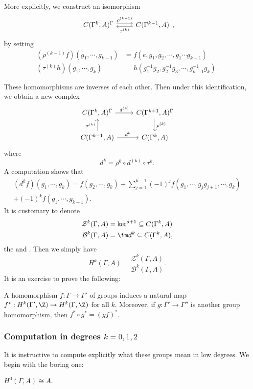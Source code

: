\documentclass[a4paper]{article}
\begin{document}
More explicitly, we construct an isomorphism
\[
  \begin{tikzcd}
    C(\Gamma^k, A)^\Gamma \ar[r, yshift=2, "\rho^{(k - 1)}"] & C(\Gamma^{k - 1}, A)\ar[l, yshift=-2, "\tau^{(k)}"]
  \end{tikzcd},
\]
by setting
\begin{align*}
  (\rho^{(k - 1)} f)(g_1, \cdots, g_{k - 1}) &= f(e, g_1, g_2, \cdots, g_1 \cdots g_{k - 1})\\
  (\tau^{(k)} h)(g_1, \cdots, g_k) &= h (g_1^{-1} g_2, g_2^{-1} g_3, \cdots, g_{k - 1}^{-1} g_k).
\end{align*}

These homomorphisms are inverses of each other. Then under this identification, we obtain a new complex
\[
  \begin{tikzcd}
    C(\Gamma^k, A)^\Gamma \ar[r, "d^{(k)}"] & C(\Gamma^{k + 1}, A)^\Gamma \ar[d,"\rho^{(k)}"] \\
    C(\Gamma^{k - 1}, A) \ar[u, "\tau^{(k)}"] \ar[r, "d^{k}"] & C(\Gamma^k, A)
  \end{tikzcd}
\]
where
\[
  d^k = \rho^k \circ d^{(k)} \circ \tau^k.
\]
A computation shows that
\begin{align*}
  (d^k f) (g_1, \cdots, g_k) = f(g_2, \cdots, g_k) + \sum_{j = 1}^{k - 1} (-1)^j f(g_1, \cdots, g_j g_{j + 1}, \cdots, g_k) \\
  + (-1)^k f(g_1, \cdots, g_{k - 1}).
\end{align*}
It is customary to denote
\begin{align*}
  \mathcal{Z}^k(\Gamma, A) &= \ker^{d + 1} \subseteq C(\Gamma^k, A)\\
  \mathcal{B}^k (\Gamma, A) &= \im d^k \subseteq C(\Gamma^k, A),
\end{align*}
the  and . Then we simply have
\[
  H^k(\Gamma, A) = \frac{\mathcal{Z}^k(\Gamma, A)}{\mathcal{B}^k(\Gamma, A)}.
\]
It is an exercise to prove the following:
\begin{lemma}
  A homomorphism $f: \Gamma \to \Gamma'$ of groups induces a natural map $f^*: H^k(\Gamma', \Z) \to H^k(\Gamma, \Z)$ for all $k$. Moreover, if $g: \Gamma' \to \Gamma''$ is another group homomorphism, then $f^* \circ g^* = (gf)^*$.
\end{lemma}

\subsubsection*{Computation in degrees $k = 0, 1, 2$}
It is instructive to compute explicitly what these groups mean in low degrees. We begin with the boring one:
\begin{prop}
  $H^0(\Gamma, A) \cong A$.
\end{prop}
\end{document}
